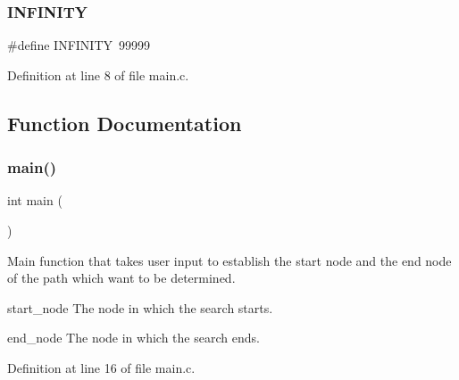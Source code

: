 \subsubsection{I\+N\+F\+I\+N\+I\+TY}
{\footnotesize\ttfamily \#define I\+N\+F\+I\+N\+I\+TY~99999}



Definition at line 8 of file main.\+c.



\subsection{Function Documentation}
\mbox{\label{main_8c_ae66f6b31b5ad750f1fe042a706a4e3d4}} 
\subsubsection{main()}
{\footnotesize\ttfamily int main (\begin{DoxyParamCaption}{ }\end{DoxyParamCaption})}

Main function that takes user input to establish the start node and the end node of the path which want to be determined.

start\+\_\+node The node in which the search starts.

end\+\_\+node The node in which the search ends. 

Definition at line 16 of file main.\+c.

